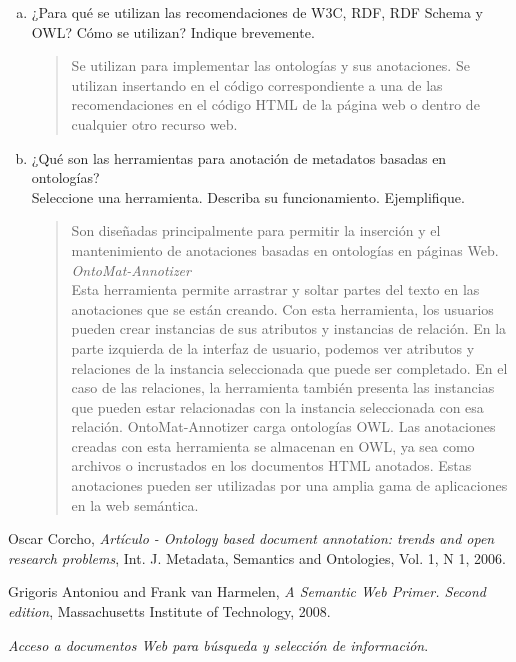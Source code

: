 \documentclass[a4paper,12pt,oneside,final,spanish]{article}
\begin{document}
\begin{enumerate}[a.]
\item ¿Para qué se utilizan las recomendaciones de W3C, RDF, RDF Schema y OWL? Cómo se utilizan? Indique brevemente.

\dotfill

\begin{quote}
Se utilizan para implementar las ontologías y sus anotaciones. Se utilizan insertando en el código correspondiente a una de las recomendaciones en el código HTML de la página web o dentro de cualquier otro recurso web.
\end{quote}

\item ¿Qué son las herramientas para anotación de metadatos basadas en ontologías?\\
Seleccione una herramienta. Describa su funcionamiento. Ejemplifique.  

\dotfill

\begin{quote}
Son diseñadas principalmente para permitir la inserción y el mantenimiento de anotaciones basadas en ontologías en páginas Web.\\

\textit{OntoMat-Annotizer}\\
Esta herramienta permite arrastrar y soltar partes del texto en las anotaciones que se están creando. Con esta herramienta, los usuarios pueden crear instancias de sus atributos y instancias de relación. En la parte izquierda de la interfaz de usuario, podemos ver atributos y relaciones de la instancia seleccionada que puede ser completado. En el caso de las relaciones, la herramienta también presenta las instancias que pueden estar relacionadas con la instancia seleccionada con esa relación. OntoMat-Annotizer carga ontologías OWL. Las anotaciones creadas con esta herramienta se almacenan en OWL, ya sea como archivos o incrustados en los documentos HTML anotados. Estas anotaciones pueden ser utilizadas por una amplia gama de aplicaciones en la web semántica.
\end{quote}

\end{enumerate}

\begin{thebibliography}{1} 
Oscar Corcho,
\emph{Artículo - Ontology based document annotation: trends and open research problems},
Int. J. Metadata, Semantics and Ontologies, Vol. 1, N 1, 
2006.

Grigoris Antoniou and Frank van Harmelen,
\emph{A Semantic Web Primer. Second edition},
Massachusetts Institute of Technology,
2008.

\emph{Acceso  a  documentos  Web  para  búsqueda  y 
selección de información}.
\end{thebibliography}
\end{document}
